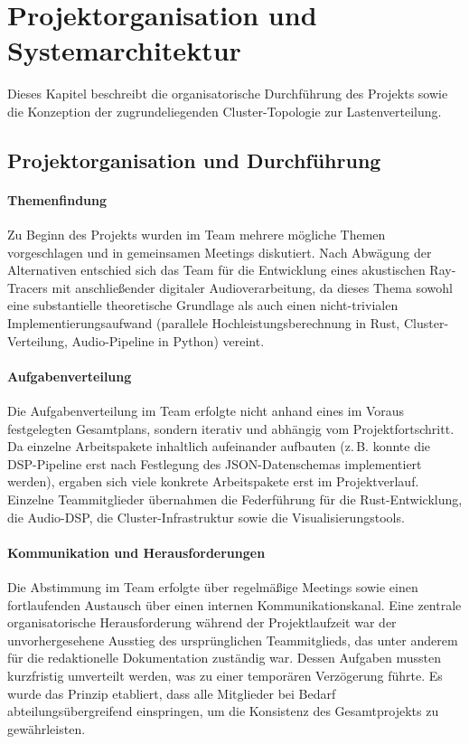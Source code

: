 
\section{Projektorganisation und Systemarchitektur}
\label{sec:orga_und_architektur}

Dieses Kapitel beschreibt die organisatorische Durchführung des Projekts sowie die Konzeption der zugrundeliegenden Cluster-Topologie zur Lastenverteilung.

\subsection{Projektorganisation und Durchführung}
\label{subsec:projektorganisation}

\paragraph{Themenfindung}
Zu Beginn des Projekts wurden im Team mehrere mögliche Themen vorgeschlagen und in gemeinsamen Meetings diskutiert. Nach Abwägung der Alternativen entschied sich das Team für die Entwicklung eines akustischen Ray-Tracers mit anschließender digitaler Audioverarbeitung, da dieses Thema sowohl eine substantielle theoretische Grundlage als auch einen nicht-trivialen Implementierungsaufwand (parallele Hochleistungsberechnung in Rust, Cluster-Verteilung, Audio-Pipeline in Python) vereint.

\paragraph{Aufgabenverteilung}
Die Aufgabenverteilung im Team erfolgte nicht anhand eines im Voraus festgelegten Gesamtplans, sondern iterativ und abhängig vom Projektfortschritt. Da einzelne Arbeitspakete inhaltlich aufeinander aufbauten (z.\,B. konnte die DSP-Pipeline erst nach Festlegung des JSON-Datenschemas implementiert werden), ergaben sich viele konkrete Arbeitspakete erst im Projektverlauf. Einzelne Teammitglieder übernahmen die Federführung für die Rust-Entwicklung, die Audio-DSP, die Cluster-Infrastruktur sowie die Visualisierungstools.

\paragraph{Kommunikation und Herausforderungen}
Die Abstimmung im Team erfolgte über regelmäßige Meetings sowie einen fortlaufenden Austausch über einen internen Kommunikationskanal. Eine zentrale organisatorische Herausforderung während der Projektlaufzeit war der unvorhergesehene Ausstieg des ursprünglichen Teammitglieds, das unter anderem für die redaktionelle Dokumentation zuständig war. Dessen Aufgaben mussten kurzfristig umverteilt werden, was zu einer temporären Verzögerung führte. Es wurde das Prinzip etabliert, dass alle Mitglieder bei Bedarf abteilungsübergreifend einspringen, um die Konsistenz des Gesamtprojekts zu gewährleisten.


